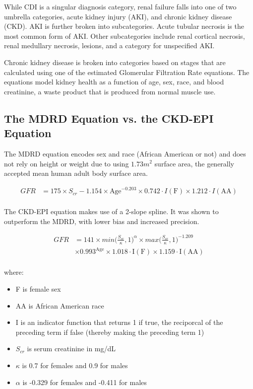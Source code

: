 \documentclass[12pt]{ociamthesis}\usepackage[]{graphicx}\usepackage[]{color}
\begin{document}
While CDI is a singular diagnosis category, renal failure falls into one of two umbrella categories, acute kidney injury (AKI), 
and chronic kidney disease (CKD). AKI is further broken into subcategories. Acute tubular necrosis is the most common form of AKI.
Other subcategories include renal cortical necrosis, renal medullary necrosis, lesions, and a category for unspecified AKI. 

Chronic kidney disease is broken into categories based on stages that are calculated using one of the estimated Glomerular Filtration Rate
equations. The equations model kidney health as a function of age, sex, race, and blood creatinine, a waste product that is produced from
normal muscle use. 

\subsection{The MDRD Equation vs. the CKD-EPI Equation}

The MDRD equation encodes sex and race (African American or not) and does not rely on height or weight due to using $1.73m^2$ surface area,
the generally accepted mean human adult body surface area. 

\begin{equation} \label{mdrd}
\begin{split}
  GFR  &= 175 \times S_{cr} - 1.154 \times \text{Age}^{-0.203} \times 0.742 \cdot I(\text{F}) \times 1.212 \cdot I(\text{AA}) \\
\end{split}
\end{equation}

The CKD-EPI equation makes use of a 2-slope spline. It was shown to outperform the MDRD, with lower bias and increased precision.  \cite{Levey2009, eGFR2018}

\begin{equation} \label{ckdepi}
\begin{split}
  GFR &= 141 \times min\bigg(\frac{S_{cr}}{\kappa}, 1\bigg)^{\alpha} \times max\bigg(\frac{S_{cr}}{\kappa}, 1\bigg)^{-1.209} \\
      &\times 0.993^{\text{Age}} \times 1.018 \cdot \text{I}(\text{F}) \times 1.159 \cdot \text{I}(\text{AA}) \\
\end{split}
\end{equation}

where:
\begin{itemize}
  \item F is female sex
  \item AA is African American race
  \item I is an indicator function that returns 1 if true, the reciporcal of the preceding term if false (thereby making the preceding term 1)
  \item $S_{cr}$ is serum creatinine in mg/dL
  \item $\kappa$ is 0.7 for females and 0.9 for males
  \item $\alpha$ is -0.329 for females and -0.411 for males
\end{itemize}
\end{document}
